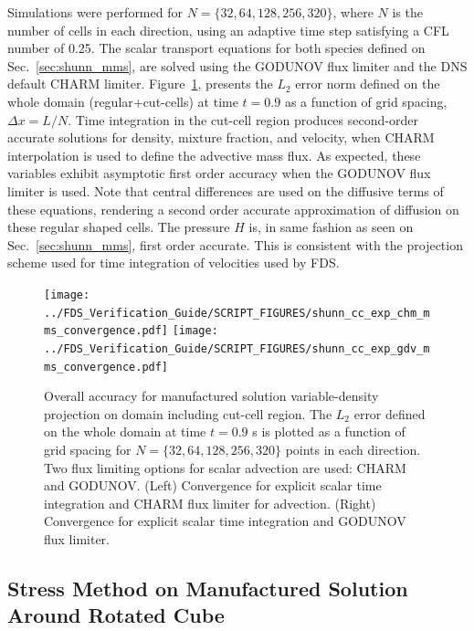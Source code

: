 \documentclass[11pt]{book}
\begin{document}
Simulations were performed for $N = \{32, 64, 128, 256, 320\}$, where $N$ is the number of cells in each direction, using an adaptive time step satisfying a CFL number of 0.25. The scalar transport equations for both species defined on Sec.~\ref{sec:shunn_mms}, are solved using the {\ct GODUNOV} flux limiter and the DNS default {\ct CHARM} limiter. Figure~\ref{fig:shunn_cc_accuracy_order}, presents the $L_2$ error norm defined on the whole domain (regular+cut-cells) at time $t = 0.9$ as a function of grid spacing, $\Delta x = L/N$. Time integration in the cut-cell region produces second-order accurate solutions for density, mixture fraction, and velocity, when {\ct CHARM} interpolation is used to define the advective mass flux. As expected, these variables exhibit asymptotic first order accuracy when the {\ct GODUNOV} flux limiter is used. Note that central differences are used on the diffusive terms of these equations, rendering a second order accurate approximation of diffusion on these regular shaped cells. The pressure $H$ is, in same fashion as seen on Sec.~\ref{sec:shunn_mms}, first order accurate. This is consistent with the projection scheme used for time integration of velocities used by FDS.


\begin{figure}[ht]
\centering
\texttt{[image: ../FDS\_Verification\_Guide/SCRIPT\_FIGURES/shunn\_cc\_exp\_chm\_mms\_convergence.pdf]}
\texttt{[image: ../FDS\_Verification\_Guide/SCRIPT\_FIGURES/shunn\_cc\_exp\_gdv\_mms\_convergence.pdf]}
\caption[The {\ct Shunn CC} accuracy order test case]{Overall accuracy for manufactured solution variable-density projection on domain including cut-cell region. The $L_2$ error defined on the whole domain at time $t = 0.9$ s is plotted as a function of grid spacing for $N=\{32,64,128,256,320\}$ points in each direction. Two flux limiting options for scalar advection are used: {\ct CHARM} and {\ct GODUNOV}.  (Left) Convergence for explicit scalar time integration and {\ct CHARM} flux limiter for advection.  (Right) Convergence for explicit scalar time integration and {\ct GODUNOV} flux limiter. }\label{fig:shunn_cc_accuracy_order}
\end{figure}


\subsection{Stress Method on Manufactured Solution Around Rotated Cube}

\label{sec:rotcube_cc_mms}
\end{document}
